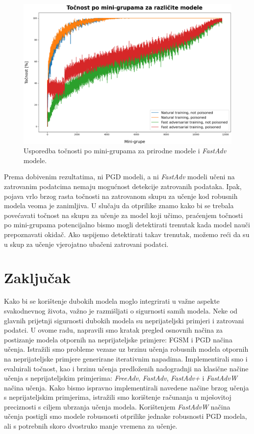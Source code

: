 \documentclass[times, utf8, zavrsni, numeric]{fer}
\begin{document}
\begin{figure}[htb]
    \centering
    \includegraphics[scale=0.41]{../stats/train_accuracy_comparison_nat_fast.png}
    \caption{Usporedba točnosti po mini-grupama za prirodne modele i \textit{FastAdv} modele.}
    \label{fig:fast_nat_poisoned_comparison}
\end{figure}

Prema dobivenim rezultatima, ni PGD modeli, a ni \textit{FastAdv} modeli učeni na zatrovanim podatcima nemaju mogućnost detekcije zatrovanih podataka.
Ipak, pojava vrlo brzog rasta točnosti na zatrovanom skupu za učenje kod robusnih modela veoma je zanimljiva.
U slučaju da otprilike znamo kako bi se trebala povećavati točnost na skupu za učenje za model koji učimo, 
praćenjem točnosti po mini-grupama potencijalno bismo mogli detektirati trenutak kada model nauči prepoznavati okidač. 
Ako uspijemo detektirati takav trenutak, možemo reći da su u skup za učenje vjerojatno ubačeni zatrovani podatci.

\chapter{Zaključak}

Kako bi se korištenje dubokih modela moglo integrirati u važne aspekte svakodnevnog života, važno je razmišljati o sigurnosti samih modela. 
Neke od glavnih prijetnji sigurnosti dubokih modela su neprijateljski primjeri i zatrovani podatci.
U ovome radu, napravili smo kratak pregled osnovnih načina za postizanje modela otpornih na neprijateljske primjere: FGSM i PGD načina učenja.
Istražili smo probleme vezane uz brzinu učenja robusnih modela otpornih na neprijateljske primjere generirane iterativnim napadima.
Implementirali smo i evaluirali točnost, kao i brzinu učenja predloženih nadogradnji na klasične načine učenja s neprijateljskim primjerima: \textit{FreeAdv}, \textit{FastAdv}, \textit{FastAdv+} i \textit{FastAdvW} načina učenja.
Kako bismo ispravno implementirali navedene načine brzog učenja s neprijateljskim primjerima, istražili smo korištenje računanja u mješovitoj preciznosti s ciljem ubrzanja učenja modela.
Korištenjem \textit{FastAdvW} načina učenja postigli smo modele robusnosti otprilike jednake robusnosti PGD modela, ali s potrebnih skoro dvostruko manje vremena za učenje.
\end{document}
